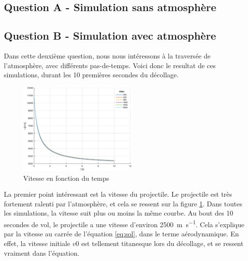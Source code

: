 \documentclass[a4paper,12pt,twoside]{article}
\begin{document}
\subsection{Question A - Simulation sans atmosphère}

\subsection{Question B - Simulation avec atmosphère}
Dans cette deuxième question, nous nous intéressons à la traversée de l'atmosphère, avec différents pas-de-temps. Voici donc le resultat de ces simulations, durant les 10 premières secondes du décollage.\\

\begin{figure}
	\vspace{-20pt}
    \includegraphics[width=0.53\textwidth]{graphs/vB.eps}
    \vspace{-15pt}
    \caption{Vitesse en fonction du temps}
    \vspace{-10pt}
    \label{fig:B-vt}
\end{figure}

La premier point intéressant est la vitesse du projectile. Le projectile est très fortement ralenti par l'atmosphère, et cela se ressent sur la figure \ref{fig:B-vt}. Dans toutes les simulations, la vitesse suit plus ou moins la même courbe. Au bout des 10 secondes de vol, le projectile a une vitesse d'environ \SI{2500}{\meter\per\second}. Cela s'explique par la vitesse au carrée de l'équation \ref{eq:sol}, dans le terme aérodynamique. En effet, la vitesse initiale $v0$ est tellement titanesque lors du décollage, et se ressent vraiment dans l'équation.\\
\end{document}
